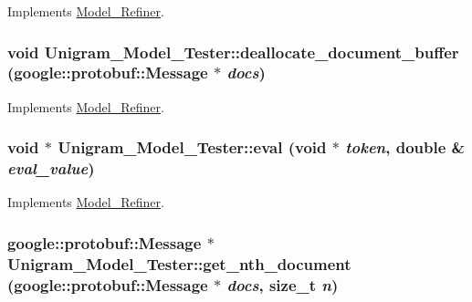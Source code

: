Implements \hyperlink{class_model___refiner_a516dd37d4b76cceeb18e6bdf269b8b04}{Model\_\-Refiner}.

\hypertarget{class_unigram___model___tester_a239d3ab22007a073927dcd80501e6579}{
\subsubsection[{deallocate\_\-document\_\-buffer}]{\setlength{\rightskip}{0pt plus 5cm}void Unigram\_\-Model\_\-Tester::deallocate\_\-document\_\-buffer (google::protobuf::Message $\ast$ {\em docs})}}
\label{class_unigram___model___tester_a239d3ab22007a073927dcd80501e6579}


Implements \hyperlink{class_model___refiner_a3787b875dfd41de8db8b1e46cfe40d16}{Model\_\-Refiner}.

\hypertarget{class_unigram___model___tester_afb32ae60aac5863d0f8ac50af4fd9ff2}{
\subsubsection[{eval}]{\setlength{\rightskip}{0pt plus 5cm}void $\ast$ Unigram\_\-Model\_\-Tester::eval (void $\ast$ {\em token}, \/  double \& {\em eval\_\-value})}}
\label{class_unigram___model___tester_afb32ae60aac5863d0f8ac50af4fd9ff2}


Implements \hyperlink{class_model___refiner_afc5cd8181d1f6fc3ebf0a6bad1d8f023}{Model\_\-Refiner}.

\hypertarget{class_unigram___model___tester_a0062dadca66fc40748590b4aa721a291}{
\subsubsection[{get\_\-nth\_\-document}]{\setlength{\rightskip}{0pt plus 5cm}google::protobuf::Message $\ast$ Unigram\_\-Model\_\-Tester::get\_\-nth\_\-document (google::protobuf::Message $\ast$ {\em docs}, \/  size\_\-t {\em n})}}
\label{class_unigram___model___tester_a0062dadca66fc40748590b4aa721a291}


